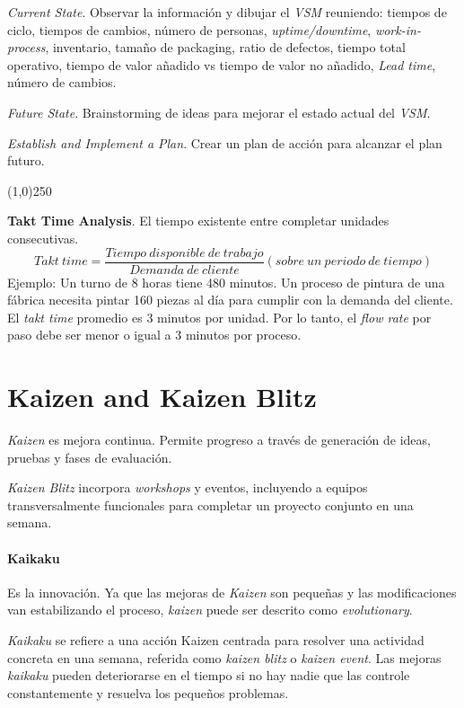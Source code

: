 \documentclass[oneside]{book}
\begin{document}
\textit{Current State}. Observar la información y dibujar el \textit{VSM} reuniendo: tiempos de ciclo, tiempos de cambios, número de personas, \textit{uptime/downtime}, \textit{work-in-process}, inventario, tamaño de packaging, ratio de defectos, tiempo total operativo, tiempo de valor añadido vs tiempo de valor no añadido, \textit{Lead time}, número de cambios.

\textit{Future State}. Brainstorming de ideas para mejorar el estado actual del \textit{VSM}.

\textit{Establish and Implement a Plan}. Crear un plan de acción para alcanzar el plan futuro.
\begin{center}
	\line(1,0){250}
\end{center}

\textbf{Takt Time Analysis}. El tiempo existente entre completar unidades consecutivas.
\begin{equation}
Takt \ time = \frac{Tiempo \ disponible \ de \ trabajo}{Demanda \ de \ cliente} (sobre \ un \ periodo \ de \ tiempo)
\end{equation}
Ejemplo: Un turno de 8 horas tiene 480 minutos. Un proceso de pintura de una fábrica necesita pintar 160 piezas al día para cumplir con la demanda del cliente. El \textit{takt time} promedio es 3 minutos por unidad. Por lo tanto, el \textit{flow rate} por paso debe ser menor o igual a 3 minutos por proceso.

\section{Kaizen and Kaizen Blitz}

\textit{Kaizen} es mejora continua. Permite progreso a través de generación de ideas, pruebas y fases de evaluación. 

\textit{Kaizen Blitz} incorpora \textit{workshops} y eventos, incluyendo a equipos transversalmente funcionales para completar un proyecto conjunto en una semana.

\paragraph{Kaikaku}

Es la innovación. Ya que las mejoras de \textit{Kaizen} son pequeñas y las modificaciones van estabilizando el proceso, \textit{kaizen} puede ser descrito como \textit{evolutionary}. 

\textit{Kaikaku} se refiere a una acción Kaizen centrada para resolver una actividad concreta en una semana, referida como \textit{kaizen blitz} o \textit{kaizen event}. Las mejoras \textit{kaikaku} pueden deteriorarse en el tiempo si no hay nadie que las controle constantemente y resuelva los pequeños problemas.
\end{document}

